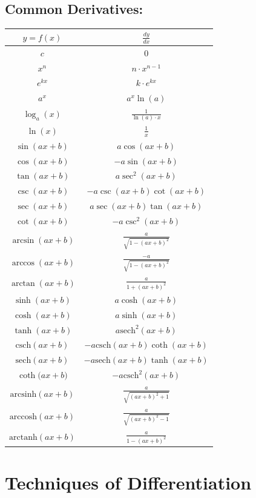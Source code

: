 \documentclass[a5paper]{article}
\newcommand{\sech}{\mathrm{sech}}
\newcommand{\csch}{\mathrm{csch}}
\newcommand{\arcsinh}{\mathrm{arcsinh}}
\newcommand{\arccosh}{\mathrm{arccosh}}
\newcommand{\arctanh}{\mathrm{arctanh}}
\begin{document}
	\subsection{Common Derivatives:}
	\begin{center}
	\begin{tabular}{ |c|c| }
		\hline
		$y=f(x)$ & $\frac{dy}{dx}$ \\
		\hline
		$c$ & $0$ \\
		$x^{n}$ & $n\cdot x^{n-1}$ \\
		$e^{kx}$ & $k\cdot e^{kx}$ \\
		$a^{x}$ & $a^{x}\ln{(a)}$ \\
		$\log_{a}{(x)}$ & $\frac{1}{\ln{(a)}\cdot x}$ \\
		$\ln{(x)}$ & $\frac{1}{x}$ \\
		$\sin{(ax+b)}$ & $a\cos{(ax+b)}$ \\
		$\cos{(ax+b)}$ & $-a\sin{(ax+b)}$ \\
		$\tan{(ax+b)}$ & $a\sec^{2}{(ax+b)}$ \\
		$\csc{(ax+b)}$ & $-a\csc{(ax+b)}\cot{(ax+b)}$ \\
		$\sec{(ax+b)}$ & $a\sec{(ax+b)}\tan{(ax+b)}$ \\
		$\cot{(ax+b)}$ & $-a\csc^{2}{(ax+b)}$ \\
		$\arcsin{(ax+b)}$ & $\frac{a}{\sqrt{1-(ax+b)^{2}}}$ \\
		$\arccos{(ax+b)}$ & $\frac{-a}{\sqrt{1-(ax+b)^{2}}}$ \\
		$\arctan{(ax+b)}$ & $\frac{a}{1+(ax+b)^{2}}$ \\
		$\sinh{(ax+b)}$ & $a\cosh{(ax+b)}$ \\
		$\cosh{(ax+b)}$ & $a\sinh{(ax+b)}$ \\
		$\tanh{(ax+b)}$ & $a\sech^{2}{(ax+b)}$ \\
		$\csch{(ax+b)}$ & $-a\csch{(ax+b)}\coth{(ax+b)}$ \\
		$\sech{(ax+b)}$ & $-a\sech{(ax+b)}\tanh{(ax+b)}$ \\
		$\coth{(ax+b})$ & $-a\csch^{2}{(ax+b)}$ \\
		$\arcsinh{(ax+b)}$ & $\frac{a}{\sqrt{(ax+b)^{2}+1}}$ \\
		$\arccosh{(ax+b)}$ & $\frac{a}{\sqrt{(ax+b)^{2}-1}}$ \\
		$\arctanh{(ax+b)}$ & $\frac{a}{1-(ax+b)^{2}}$ \\
		\hline
	\end{tabular}
	\end{center}

	\section{Techniques of Differentiation}
\end{document}
